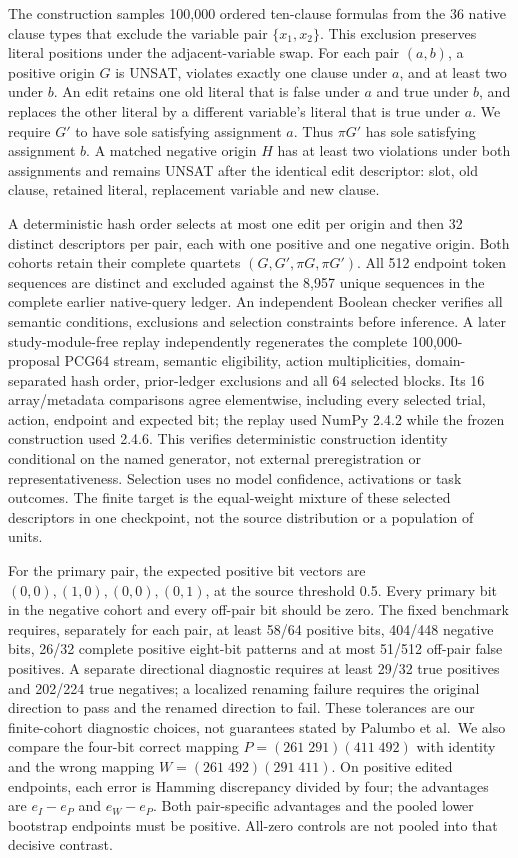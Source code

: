 \documentclass[
  british,
  11pt,
  a4paper,
]{article}
\begin{document}
The construction samples 100,000 ordered ten-clause formulas from the 36
native clause types that exclude the variable pair \(\{x_1,x_2\}\). This
exclusion preserves literal positions under the adjacent-variable swap.
For each pair \((a,b)\), a positive origin \(G\) is UNSAT, violates
exactly one clause under \(a\), and at least two under \(b\). An edit
retains one old literal that is false under \(a\) and true under \(b\),
and replaces the other literal by a different variable's literal that is
true under \(a\). We require \(G'\) to have sole satisfying assignment
\(a\). Thus \(\pi G'\) has sole satisfying assignment \(b\). A matched
negative origin \(H\) has at least two violations under both assignments
and remains UNSAT after the identical edit descriptor: slot, old clause,
retained literal, replacement variable and new clause.

A deterministic hash order selects at most one edit per origin and then
32 distinct descriptors per pair, each with one positive and one
negative origin. Both cohorts retain their complete quartets
\((G,G',\pi G,\pi G')\). All 512 endpoint token sequences are distinct
and excluded against the 8,957 unique sequences in the complete earlier
native-query ledger. An independent Boolean checker verifies all
semantic conditions, exclusions and selection constraints before
inference. A later study-module-free replay independently regenerates
the complete 100,000-proposal PCG64 stream, semantic eligibility, action
multiplicities, domain-separated hash order, prior-ledger exclusions and
all 64 selected blocks. Its 16 array/metadata comparisons agree
elementwise, including every selected trial, action, endpoint and
expected bit; the replay used NumPy 2.4.2 while the frozen construction
used 2.4.6. This verifies deterministic construction identity
conditional on the named generator, not external preregistration or
representativeness. Selection uses no model confidence, activations or
task outcomes. The finite target is the equal-weight mixture of these
selected descriptors in one checkpoint, not the source distribution or a
population of units.

For the primary pair, the expected positive bit vectors are
\((0,0),(1,0),(0,0),(0,1)\), at the source threshold 0.5. Every primary
bit in the negative cohort and every off-pair bit should be zero. The
fixed benchmark requires, separately for each pair, at least 58/64
positive bits, 404/448 negative bits, 26/32 complete positive eight-bit
patterns and at most 51/512 off-pair false positives. A separate
directional diagnostic requires at least 29/32 true positives and
202/224 true negatives; a localized renaming failure requires the
original direction to pass and the renamed direction to fail. These
tolerances are our finite-cohort diagnostic choices, not guarantees
stated by Palumbo et al.~We also compare the four-bit correct mapping
\(P=(261\;291)(411\;492)\) with identity and the wrong mapping
\(W=(261\;492)(291\;411)\). On positive edited endpoints, each error is
Hamming discrepancy divided by four; the advantages are \(e_I-e_P\) and
\(e_W-e_P\). Both pair-specific advantages and the pooled lower
bootstrap endpoints must be positive. All-zero controls are not pooled
into that decisive contrast.
\end{document}
